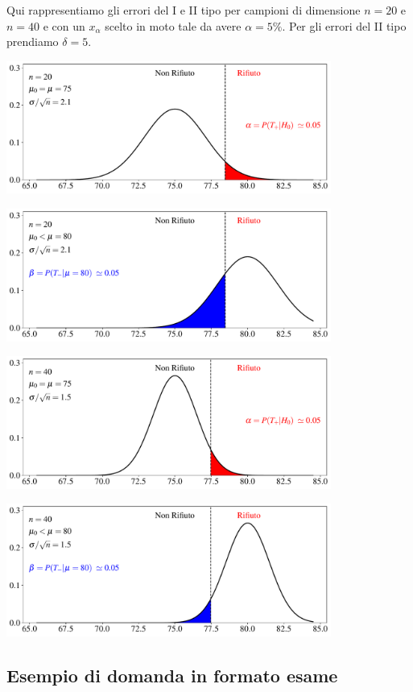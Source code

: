 \documentclass[11pt,openany]{book}
\begin{document}
Qui rappresentiamo gli errori del I e II tipo per campioni di dimensione $n=20$ e $n= 40$ e con un $x_\alpha$ scelto in moto tale da avere $\alpha=5\%$. Per gli errori del II tipo prendiamo $\delta=5$.

\hfil\includegraphics[width=0.8\textwidth]{figure/Z-test_01.pdf}

\hfil\includegraphics[width=0.8\textwidth]{figure/Z-test_02.pdf}

\hfil\includegraphics[width=0.8\textwidth]{figure/Z-test_03.pdf}

\hfil\includegraphics[width=0.8\textwidth]{figure/Z-test_04.pdf}



\hfill{}\clearpage\subsection{Esempio di domanda in formato esame}
\end{document}

